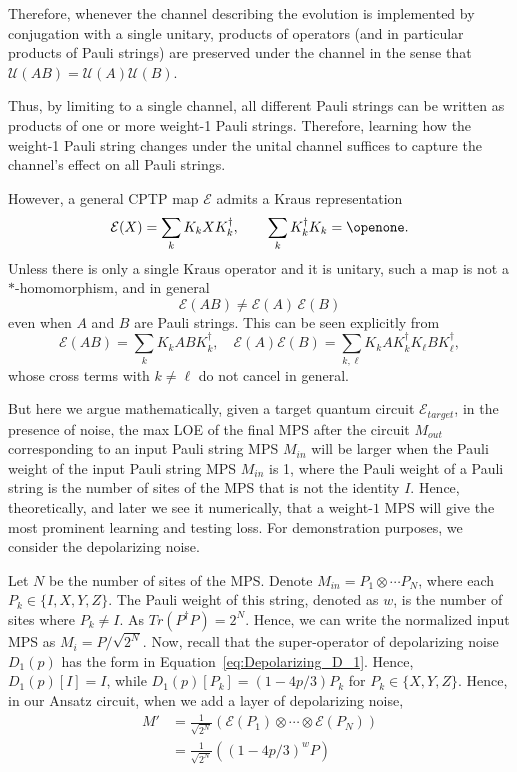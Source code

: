 \documentclass[%
 reprint,
superscriptaddress,
 amsmath,amssymb,
 aps,
]{revtex4-2}
\newcommand{\E}{\mathcal{E}}
\begin{document}
Therefore, whenever the channel describing the evolution is implemented by conjugation with a single unitary, products of operators (and in particular products of Pauli strings) are preserved under the channel in the sense that $\mathcal{U}(AB)=\mathcal{U}(A)\mathcal{U}(B)$.

Thus, by limiting to a single channel, all different Pauli strings can be written as products of one or more weight-1 Pauli strings. Therefore, learning how the weight-1 Pauli string changes under the unital channel suffices to capture the channel's effect on all Pauli strings.

However, a general CPTP map $\mathcal{E}$ admits a Kraus representation
\begin{equation}
  \mathcal{E}(X) = \sum_{k} K_k X K_k^{\dagger},
  \qquad \sum_{k} K_k^{\dagger}K_k = \openone.
\end{equation}
Unless there is only a single Kraus operator and it is unitary, such a map is not a $*$-homomorphism, and in general
\begin{equation}
  \mathcal{E}(AB) \neq \mathcal{E}(A)\,\mathcal{E}(B)
\end{equation}
even when $A$ and $B$ are Pauli strings.
This can be seen explicitly from
\begin{equation}
  \mathcal{E}(AB)
  = \sum_{k} K_k A B K_k^{\dagger},
  \quad
  \mathcal{E}(A)\mathcal{E}(B)
  = \sum_{k,\ell} K_k A K_k^{\dagger} K_{\ell} B K_{\ell}^{\dagger},
\end{equation}
whose cross terms with $k\neq \ell$ do not cancel in general.

But here we argue mathematically, given a target quantum circuit $\E_{target}$, in the presence of noise, the max LOE of the final MPS after the circuit $M_{out}$ corresponding to an input Pauli string MPS $M_{in}$ will be larger when the Pauli weight of the input Pauli string MPS $M_{in}$ is 1, where the Pauli weight of a Pauli string is the number of sites of the MPS that is not the identity $I$. Hence, theoretically, and later we see it numerically, that a weight-$1$ MPS will give the most prominent learning and testing loss. For demonstration purposes, we consider the depolarizing noise.

Let $N$ be the number of sites of the MPS. Denote $M_{in}= P_1\otimes\cdots P_N$, where each $P_k \in\{I, X, Y, Z\}$.
The Pauli weight of this string, denoted as $w$, is the number of sites where $P_k\ne I$. As $Tr(P^\dagger P)=2^N$. Hence, we can write the normalized input MPS as $M_i = P/\sqrt{2^N}$. Now, recall that the super-operator of depolarizing noise $D_1(p)$ has the form in Equation~\ref{eq:Depolarizing_D_1}. Hence, $D_1(p)[I]=I$, while $D_1(p)[P_k]=(1-4p/3)P_k$ for $P_k\in\{X, Y, Z\}$. Hence, in our Ansatz circuit, when we add a layer of depolarizing noise,
\begin{equation}
\begin{split}
    M' &= \frac{1}{\sqrt{2^N}}\left(\E(P_1)\otimes \cdots\otimes \E(P_N)\right)\\
    &=\frac{1}{\sqrt{2^N}}\left((1-4p/3)^w P\right)
\end{split}
\end{equation}
\end{document}
